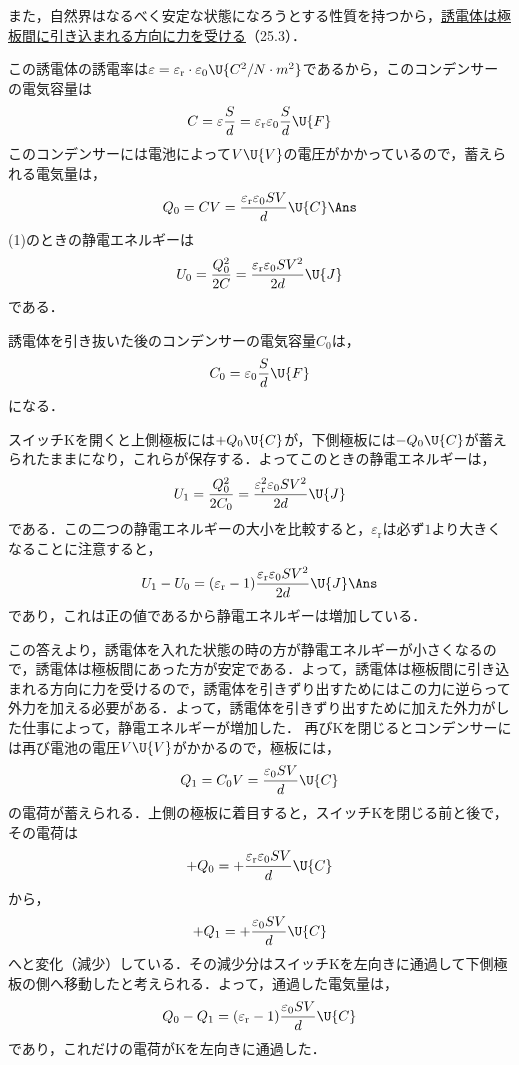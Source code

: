 \begin{multicols}{2}
\begin{sisin}
また，自然界はなるべく安定な状態になろうとする性質を持つから，\underline{誘電体は}\hskip0pt\underline{極板間に}\hskip0pt\underline{引き込ま}\hskip0pt\underline{れる方向}\hskip0pt\underline{に力を受}\hskip0pt\underline{ける}（25.3）．
\end{sisin}
\KaiHead
\begin{komon}
 この誘電体の誘電率は$\varepsilon=\varepsilon_{\mathrm{r}}\cdot\varepsilon_0\U{C^2/N\cdot m^2}$であるから，このコンデンサーの電気容量は
       \[C=\varepsilon\frac{S}{d}=\varepsilon_{\mathrm{r}}\varepsilon_0\frac{S}{d}\U{F}\]
       このコンデンサーには電池によって$V\U{V}$の電圧がかかっているので，蓄えられる電気量は，
       \[Q_0=CV=\frac{\varepsilon_{\mathrm{r}}\varepsilon_0SV}{d}\U{C}\Ans\]
 (1)のときの静電エネルギーは
       \[U_0=\frac{Q_0^2}{2C}=\frac{\varepsilon_{\mathrm{r}}\varepsilon_0SV^2}{2d}\U{J}\]
       である．

       誘電体を引き抜いた後のコンデンサーの電気容量$C_0$は，
       \[C_0=\varepsilon_0\frac{S}{d}\U{F}\]
       になる．

       スイッチ$\mathrm{K}$を開くと上側極板には$+Q_0\U{C}$が，下側極板には$-Q_0\U{C}$が蓄えられたままになり，これらが保存する．よってこのときの静電エネルギーは，
       \[U_1=\frac{Q_0^2}{2C_0}=\frac{\varepsilon_{\mathrm{r}}^2\varepsilon_0SV^2}{2d}\U{J}\]
       である．この二つの静電エネルギーの大小を比較すると，$\varepsilon_{\mathrm{r}}$は必ず$1$より大きくなることに注意すると，
       \[U_1-U_0=(\varepsilon_{\mathrm{r}}-1)\frac{\varepsilon_{\mathrm{r}}\varepsilon_0SV^2}{2d}\U{J}\Ans\]
       であり，これは正の値であるから静電エネルギーは増加している．

       この答えより，誘電体を入れた状態の時の方が静電エネルギーが小さくなるので，誘電体は極板間にあった方が安定である．よって，誘電体は極板間に引き込まれる方向に力を受けるので，誘電体を引きずり出すためにはこの力に逆らって外力を加える必要がある．よって，誘電体を引きずり出すために加えた外力がした仕事によって，静電エネルギーが増加した．\hspace*{\fill}\Ans
{} 再び$\mathrm{K}$を閉じるとコンデンサーには再び電池の電圧$V\U{V}$がかかるので，極板には，
       \[Q_1=C_0V=\frac{\varepsilon_0SV}{d}\U{C}\]
       の電荷が蓄えられる．上側の極板に着目すると，スイッチ$\mathrm{K}$を閉じる前と後で，その電荷は
       \[+Q_0=+\frac{\varepsilon_{\mathrm{r}}\varepsilon_0SV}{d}\U{C}\]
       から，
       \[+Q_1=+\frac{\varepsilon_0SV}{d}\U{C}\]
       へと変化（減少）している．その減少分はスイッチ$\mathrm{K}$を左向きに通過して下側極板の側へ移動したと考えられる．よって，通過した電気量は，
       \[Q_0-Q_1=(\varepsilon_{\mathrm{r}}-1)\frac{\varepsilon_0SV}{d}\U{C}\]
       であり，これだけの電荷が$\mathrm{K}$を左向きに通過した．\hspace*{\fill}\Ans
\end{komon}


\end{multicols}
